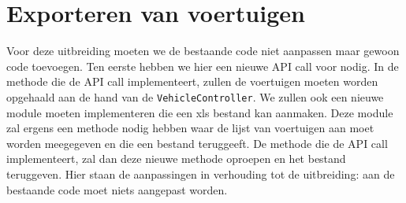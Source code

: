 \documentclass{article}
\begin{document}
\section{Exporteren van voertuigen}

Voor deze uitbreiding moeten we de bestaande code niet aanpassen maar gewoon code toevoegen. Ten eerste hebben we hier een nieuwe API call voor nodig. In de methode die de API call implementeert, zullen de voertuigen moeten worden opgehaald aan de hand van de \verb|VehicleController|. We zullen ook een nieuwe module moeten implementeren die een xls bestand kan aanmaken. Deze module zal ergens een methode nodig hebben waar de lijst van voertuigen aan moet worden meegegeven en die een bestand teruggeeft. De methode die de API call implementeert, zal dan deze nieuwe methode oproepen en het bestand teruggeven. Hier staan de aanpassingen in verhouding tot de uitbreiding: aan de bestaande code moet niets aangepast worden. 
\end{document}
